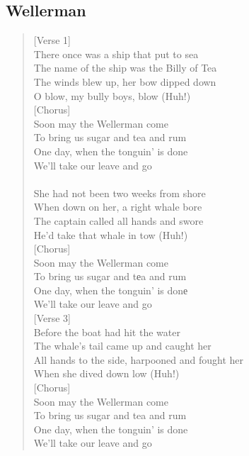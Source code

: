 \documentclass[11pt]{article}
\begin{document}
\subsection{Wellerman}
\label{sec:org37299d1}
\begin{verse}
[Verse 1]\\
There once was a ship that put to sea\\
The name of the ship was the Billy of Tea\\
The winds blew up, her bow dipped down\\
O blow, my bully boys, blow (Huh!)\\
\vspace*{1em}
[Chorus]\\
Soon may the Wellerman come\\
To bring us sugar and tea and rum\\
One day, when the tonguin' is done\\
We'll take our leave and go\\
[Verse 2]\\
She had not been two weeks from shore\\
When down on her, a right whale bore\\
The captain called all hands and swore\\
He'd take that whale in tow (Huh!)\\
\vspace*{1em}
[Chorus]\\
Soon may the Wellerman come\\
To bring us sugar and tеa and rum\\
One day, when the tonguin' is donе\\
We'll take our leave and go\\
\vspace*{1em}
[Verse 3]\\
Before the boat had hit the water\\
The whale's tail came up and caught her\\
All hands to the side, harpooned and fought her\\
When she dived down low (Huh!)\\
\vspace*{1em}
[Chorus]\\
Soon may the Wellerman come\\
To bring us sugar and tea and rum\\
One day, when the tonguin' is done\\
We'll take our leave and go\\

\end{verse}
\end{document}
